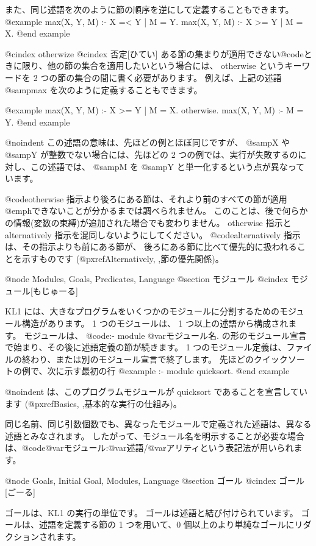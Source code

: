 また、同じ述語を次のように節の順序を逆にして定義することもできます。
@example
max(X, Y, M) :- X =< Y | M = Y.
max(X, Y, M) :- X >= Y | M = X.
@end example

@cindex otherwize
@cindex 否定[ひてい]
ある節の集まりが適用できない@code{ときに限り}、他の節の集合を適用したいという場合には、 otherwise というキーワードを 2 つの節の集合の間に書く必要があります。
例えば、上記の述語 @samp{max} を次のように定義することもできます。

@example
max(X, Y, M) :- X >= Y | M = X.
otherwise.
max(X, Y, M) :- M = Y.
@end example

@noindent
この述語の意味は、先ほどの例とほぼ同じですが、 @samp{X} や @samp{Y} が整数でない場合には、先ほどの 2 つの例では、実行が失敗するのに対し、この述語では、 @samp{M} を @samp{Y} と単一化するという点が異なっています。

@code{otherwise} 指示より後ろにある節は、それより前のすべての節が適用@emph{できない}ことが分かるまでは調べられません。
このことは、後で何らかの情報(変数の束縛)が追加された場合でも変わりません。
 otherwise 指示と alternatively 指示を混同しないようにしてください。
@code{alternatively} 指示は、その指示よりも前にある節が、
後ろにある節に比べて優先的に扱われることを示すものです
(@pxref{Alternatively, ,節の優先関係})。

@node Modules, Goals, Predicates, Language
@section モジュール
@cindex モジュール[もじゅーる]

KL1 には、大きなプログラムをいくつかのモジュールに分割するためのモジュール構造があります。
 1 つのモジュールは、 1 つ以上の述語から構成されます。
モジュールは、 @code{:- module @var{モジュール名}.} の形のモジュール宣言で始まり、その後に述語定義の節が続きます。
 1 つのモジュール定義は、ファイルの終わり、または別のモジュール宣言で終了します。
先ほどのクイックソートの例で、次に示す最初の行
@example
:- module quicksort.
@end example

@noindent
は、このプログラムモジュールが quicksort であることを宣言しています
(@pxref{Basics, ,基本的な実行の仕組み})。

同じ名前、同じ引数個数でも、異なったモジュールで定義された述語は、異なる述語とみなされます。
したがって、モジュール名を明示することが必要な場合は、@code{@var{モジュール}:@var{述語}/@var{アリティ}}という表記法が用いられます。

@node Goals, Initial Goal, Modules, Language
@section ゴール
@cindex ゴール[ごーる]

ゴールは、KL1 の実行の単位です。
ゴールは述語と結び付けられています。
ゴールは、述語を定義する節の 1 つを用いて、0 個以上のより単純なゴールにリダクションされます。

